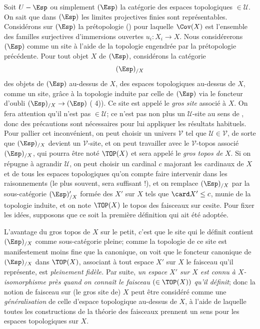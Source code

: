 \documentclass[10pt]{../fichiers-configuration-latex/smfart}
\begin{document}
Soit $U-\Esp$ ou simplement $(\Esp)$ la catégorie des espaces
topologiques $\in 𝒰$. On sait que dans $(\Esp)$ les limites
projectives finies sont représentables. Considérons sur $(\Esp)$
la prétopologie () pour laquelle $\Cov(X)$ est
l'ensemble des familles surjectives d'immersions ouvertes
$u_i:X_i\rightarrow X$. Nous considérerons $(\Esp)$ comme un site
à l'aide de la topologie engendrée par la prétopologie
précédente. Pour tout objet $X$ de $(\Esp)$, considérons la
catégorie
$$
(\Esp)_{/X}
$$
des objets de $(\Esp)$ au-dessus de $X$, \ie des espaces
topologiques au-dessus de $X$, comme un site, grâce à la topologie
induite par celle de $(\Esp)$ via le foncteur d'oubli
$(\Esp)_{/X}\rightarrow (\Esp)$ ( 4)). Ce site est
appelé le \emph{gros site} associé à $X$. On fera attention qu'il
n'est pas $\in 𝒰$; ce n'est pas non plus un $𝒰$-site
au sens de , donc des précautions sont nécessaires
pour lui appliquer les résultats habituels. Pour pallier cet
inconvénient, on peut choisir un univers $𝒱$ tel que
$𝒰\in 𝒱$, de sorte que $(\Esp)_{/X}$ devient un
$𝒱$-site, et on peut travailler avec le $𝒱$-topos
associé $(\Esp)_{/X}$, qui pourra être noté $\TOP(X)$ et sera appelé
le \emph{gros topos de} $X$. Si on répugne à agrandir $𝒰$,
on peut choisir un cardinal $c$ majorant les cardinaux de $X$ et de
tous les espaces topologiques qu'on compte faire intervenir dans les
raisonnements (le plus souvent, 
sera suffisant !), et on remplace $(\Esp)_{/X}$ par la
sous-catégorie $(\Esp)'_{/X}$ formée des $X'$ sur $X$ tels que
$\card X'\leq c$, munie de la topologie induite, et on note
$\TOP(X)$ le topos des faisceaux sur ce\pageoriginale site. Pour
fixer les idées, supposons que ce soit la première définition qui
ait été adoptée.

L'avantage du gros topos de $X$ sur le petit, c'est que le site qui
le définit contient $(\Esp)_{/X}$ comme sous-catégorie pleine; comme
la topologie de ce site est manifestement moins fine que la
canonique, on voit que le foncteur canonique de $(\Esp)_{/X}$ dans
$\TOP(X)$, associant à tout espace $X'$ sur $X$ le faisceau qu'il
représente, est \emph{pleinement fidèle.} Par suite, \emph{un espace
$X'$ sur $X$ est connu à $X$-isomorphisme près quand on connaît le
faisceau $(\in \TOP(X))$ qu'il définit}; donc la notion de faisceau
sur (le gros site de) $X$ peut être considéré comme une
\emph{généralisation} de celle d'espace topologique au-dessus de
$X$, à l'aide de laquelle toutes les constructions de la théorie des
faisceaux prennent un sens pour les espaces topologiques sur $X$.
\end{document}
